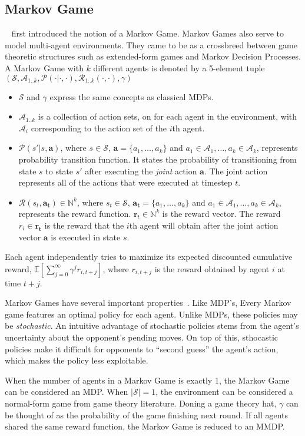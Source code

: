 \documentclass{../main.tex}{}
\begin{document}
\subsection{Markov Game}

~\cite{Owen1982} first introduced the notion of a Markov Game. Markov Games also serve to model multi-agent environments. They came to be as a crossbreed between game theoretic structures such as extended-form games and Markov Decision Processes. 
A Markov Game with $k$ different agents is denoted by a 5-element tuple $(\mathcal{S}, {\mathcal{A}_{1..k}}, \mathcal{P}(\cdot | \cdot, \cdot), {\mathcal{R}_{1..k}(\cdot, \cdot)}, \gamma)$
\begin{itemize}
    \item $\mathcal{S}$ and $\gamma$ express the same concepts as classical MDPs.
    \item $\mathcal{A}_{1..k}$ is a collection of action sets, on for each agent in the environment, with $\mathcal{A}_i$ corresponding to the action set of the $i$th agent.
    \item $\mathcal{P}(s' | s, \mathbf{a})$, where $s \in \mathcal{S}$, $\mathbf{a} = \{a_1,\ldots,a_k\}$ and $a_1 \in \mathcal{A}_1, \ldots, a_k \in \mathcal{A}_k$, represents probability transition function. It states the probability of transitioning from state $s$ to state $s'$ after executing the \textit{joint} action $\mathbf{a}$. The joint action represents all of the actions that were executed at timestep $t$.
    \item $\mathcal{R}(s_t, \mathbf{a_t}) \in \mathbb{N}^k$, where $s_t \in \mathcal{S}$, $\mathbf{a_t} = \{a_1,\ldots,a_k\}$ and $a_1 \in \mathcal{A}_1, \ldots, a_k \in \mathcal{A}_k$, represents the reward function. $\boldsymbol{r}_t \in \mathbb{N}^k$ is the reward vector. The reward $r_i \in \boldsymbol{r_t}$ is the reward that the $i$th agent will obtain after the joint action vector $\mathbf{a}$ is executed in state $s$.
\end{itemize}

Each agent independently tries to maximize its expected discounted cumulative reward, $\mathbb{E}[\sum_{j=0}^{\infty} \gamma^{j} r_{i,t+j}]$, where $r_{i, t+j}$ is the reward obtained by agent $i$ at time $t+j$.

Markov Games have several important properties~\cite{Owen1982, Littman1994}. Like MDP's, Every Markov game features an optimal policy for each agent. Unlike MDPs, these policies may be \textit{stochastic}. An intuitive advantage of stochastic policies stems from the agent's uncertainty about the opponent's pending moves. On top of this, sthocastic policies make it difficult for opponents to ``second guess'' the agent's action, which makes the policy less exploitable. 

When the number of agents in a Markov Game is exactly 1, the Markov Game can be considered an MDP\@. When $|\mathcal{S}| = 1$, the environment can be considered a normal-form game from game theory literature. Doning a game theory hat, $\gamma$ can be thought of as the probability of the game finishing next round. If all agents shared the same reward function, the Markov Game is reduced to an MMDP\@.
\end{document}
